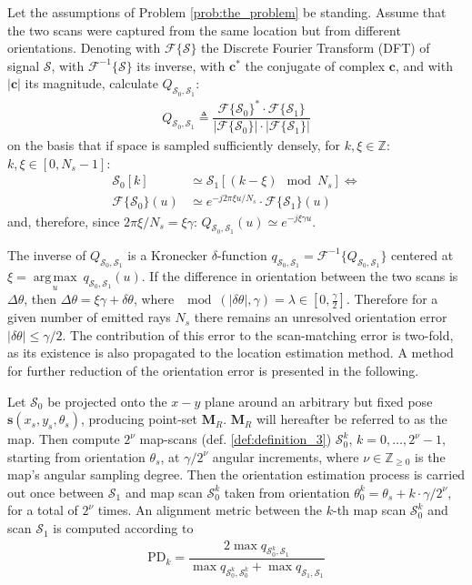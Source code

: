 Let the assumptions of Problem \ref{prob:the_problem} be standing. Assume that
the two scans were captured from the same location but from different
orientations. Denoting with $\mathcal{F}\{\mathcal{S}\}$ the Discrete Fourier
Transform (DFT) of signal $\mathcal{S}$, with $\mathcal{F}^{-1}\{\mathcal{S}\}$
its inverse, with $\bm{c}^\ast$ the conjugate of complex $\bm{c}$, and with
$|\bm{c}|$ its magnitude, calculate
$Q_{\mathcal{S}_0, \mathcal{S}_1}$:
\begin{align}
  Q_{\mathcal{S}_0, \mathcal{S}_1} \triangleq \dfrac{\mathcal{F}\{\mathcal{S}_0\}^{\ast} \cdot \mathcal{F}\{\mathcal{S}_1\}}{|\mathcal{F}\{\mathcal{S}_0\}| \cdot |\mathcal{F}\{\mathcal{S}_1\}|}
  \label{eq:Q}
\end{align}
on the basis that if space is sampled sufficiently densely, for
$k,\xi \in \mathbb{Z}$: $k,\xi \in [0, N_s-1]$:
\begin{align}
  \mathcal{S}_0[k] &\simeq \mathcal{S}_1[(k - \xi) \mod N_s] \Leftrightarrow \nonumber \\
  \mathcal{F}\{\mathcal{S}_0\}(u) &\simeq e^{-j 2\pi \xi u / N_s} \cdot \mathcal{F}\{\mathcal{S}_1\}(u) \nonumber
\end{align}
and, therefore, since $2\pi \xi/N_s = \xi \gamma$: $Q_{\mathcal{S}_0, \mathcal{S}_1}(u)  \simeq e^{-j \xi \gamma u}$.

The inverse of $Q_{\mathcal{S}_0, \mathcal{S}_1}$ is a Kronecker
$\delta$-function
$q_{\mathcal{S}_0, \mathcal{S}_1} = \mathcal{F}^{-1}\{Q_{\mathcal{S}_0, \mathcal{S}_1}\}$
centered at $\xi = \operatorname*{arg\,max}\limits_u \ q_{\mathcal{S}_0, \mathcal{S}_1}(u)$.
If the difference in orientation between the two scans is $\Delta\theta$, then
$\Delta\theta = \xi\gamma + \delta\theta$, where
$\mod(|\delta\theta|, \gamma) = \lambda \in [0,\frac{\gamma}{2}]$. Therefore for
a given number of emitted rays $N_s$ there remains an unresolved orientation
error $|\delta\theta| \leq \gamma/2$. The contribution of this error to the
scan-matching error is two-fold, as its existence is also propagated to the
location estimation method. A method for further reduction of
the orientation error is presented in the following.

Let $\mathcal{S}_0$ be projected onto the $x-y$ plane around an arbitrary but
fixed pose $\bm{s}(x_s, y_s, \theta_s)$, producing point-set $\bm{M}_R$.
$\bm{M}_R$ will hereafter be referred to as the map. Then compute $2^\nu$
map-scans (def. \ref{def:definition_3}) $\mathcal{S}_0^k$,
$k = 0,\dots,2^\nu-1$, starting from orientation $\theta_s$, at $\gamma / 2^\nu$
angular increments, where $\nu \in \mathbb{Z}_{\geq 0}$ is the map's angular
sampling degree. Then the orientation estimation process is carried out once
between $\mathcal{S}_1$ and map scan $\mathcal{S}_0^k$ taken from orientation
$\theta_0^k = \theta_s + k \cdot \gamma / 2^\nu$, for a total of $2^\nu$ times.
An alignment metric between the $k$-th map scan $\mathcal{S}_0^k$ and scan
$\mathcal{S}_1$ is computed according to
\begin{align}
  \text{PD}_k = \dfrac{2 \max q_{\mathcal{S}_0^k,\mathcal{S}_1}}{\max q_{\mathcal{S}_0^k,\mathcal{S}_0^k} + \max q_{\mathcal{S}_1,\mathcal{S}_1}}
  \label{eq:pd}
\end{align}

